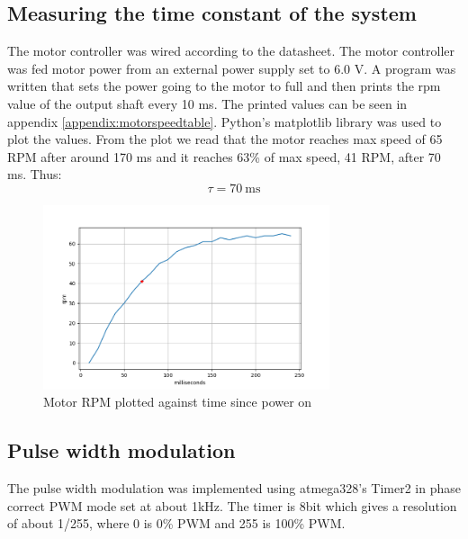 \documentclass{article}
\begin{document}
\subsection{Measuring the time constant of the system}
The motor controller was wired according to the datasheet. The motor controller was fed motor power from an external power supply set to 6.0 V.
A program was written that sets the power going to the motor to full and then prints the rpm value of the output shaft every 10 ms.
The printed values can be seen in appendix \ref{appendix:motorspeedtable}. Python's matplotlib library was used to plot the values. From the plot we read that the motor reaches max speed of 65 RPM after around 170 ms and it reaches 63\% of max speed, 41 RPM, after 70 ms. Thus:
\[\tau = 70 \SI{}{\milli\second}\]
\begin{figure}[h]
    \centering
    \includegraphics[width=0.75\textwidth]{Project2SpeedController/motor_response.png}
    \caption{Motor RPM plotted against time since power on}
    \label{fig:motor response}
\end{figure}
\subsection{Pulse width modulation}
The pulse width modulation was implemented using atmega328's Timer2 in phase correct PWM mode set at about 1kHz. The timer is 8bit which gives a resolution of about  1/255, where 0 is 0\% PWM and 255 is 100\% PWM. 

\maketitle
\end{document}
